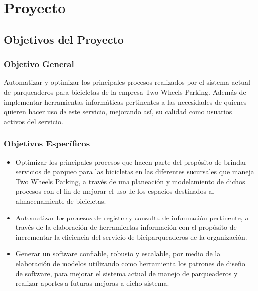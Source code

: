 \chapter{Proyecto}

\section{Objetivos del Proyecto} 

\subsection{Objetivo General} 
Automatizar y optimizar los principales procesos realizados por el sistema actual de parqueaderos para bicicletas de la empresa Two Wheels Parking. Además de implementar herramientas informáticas pertinentes a las necesidades de quienes quieren hacer uso de este servicio, mejorando así, su calidad como usuarios activos del servicio. 

\subsection{Objetivos Específicos}
\begin{itemize}
	\item Optimizar los principales procesos que hacen parte del propósito de brindar servicios de parqueo para las bicicletas en las diferentes sucursales que maneja Two Wheels Parking, a través de una planeación y modelamiento de dichos procesos con el fin de mejorar el uso de los espacios destinados al almacenamiento de bicicletas.
	\item Automatizar los procesos de registro y consulta de información pertinente, a través de la elaboración de herramientas información con el propósito de incrementar la eficiencia del servicio de biciparqueaderos de la organización.
	\item Generar un software confiable, robusto y escalable, por medio de la elaboración de modelos utilizando como herramienta los patrones de diseño de software, para mejorar el sistema actual de manejo de parqueaderos y realizar aportes a futuras mejoras a dicho sistema.
\end{itemize}
